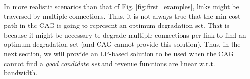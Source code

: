 \documentclass[journal]{IEEEtran}
\newtheorem{lemma}[]{Lemma}
\newtheorem{remark}{Remark}
\begin{document}
In more realistic scenarios than that of Fig. \ref{fig:first_examples}, links might be traversed by multiple connections. Thus, it is not always true that the min-cost path in the CAG is going to represent an optimum degradation set. That is because it might be necessary to degrade multiple connections per link to find an optimum degradation set (and CAG cannot provide this solution). Thus, in the next section, we will provide an LP-based solution to be used when the CAG cannot find a \textit{good candidate set} and revenue functions are linear w.r.t. bandwidth.






\end{document}
